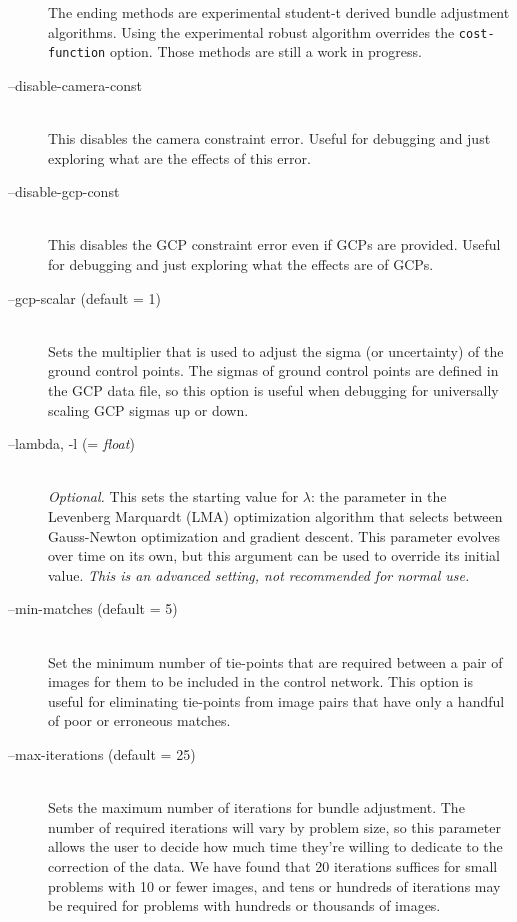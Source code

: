 \begin{description}
  The ending methods are experimental student-t derived bundle
  adjustment algorithms. Using the experimental robust algorithm
  overrides the {\tt cost-function} option. Those methods are still a
  work in progress.

\item[--disable-camera-const] \hfill \\
  This disables the camera constraint error. Useful for debugging and just
  exploring what are the effects of this error.

\item[--disable-gcp-const] \hfill \\
  This disables the GCP constraint error even if GCPs are
  provided. Useful for debugging and just exploring what the effects
  are of GCPs.

\item[--gcp-scalar \textnormal{\small{(default = 1)}}] \hfill \\
  Sets the multiplier that is used to adjust the sigma
  (or uncertainty) of the ground control points. The sigmas of ground
  control points are defined in the GCP data file, so this
  option is useful when debugging for universally scaling GCP sigmas up
  or down.

\item[--lambda, -l \textnormal{\small{(= \emph{float})}}] \hfill \\
  \emph{Optional.} This sets the starting value for $\lambda$: the
  parameter in the Levenberg Marquardt (LMA) optimization algorithm
  that selects between Gauss-Newton optimization and gradient
  descent. This parameter evolves over time on its own, but this
  argument can be used to override its initial value. \emph{This is an
  advanced setting, not recommended for normal use.}

\item[--min-matches \textnormal{\small{(default = 5)}}] \hfill \\
  Set the minimum number of tie-points that are required between a
  pair of images for them to be included in the control network. This
  option is useful for eliminating tie-points from image pairs that
  have only a handful of poor or erroneous matches.

\item[--max-iterations \textnormal{\small{(default = 25)}}] \hfill \\
  Sets the maximum number of iterations for bundle adjustment. The
  number of required iterations will vary by problem size, so this
  parameter allows the user to decide how much time they're willing
  to dedicate to the correction of the data.  We have found that 20
  iterations suffices for small problems with 10 or fewer images, and
  tens or hundreds of iterations may be required for problems with
  hundreds or thousands of images.


\end{description}
